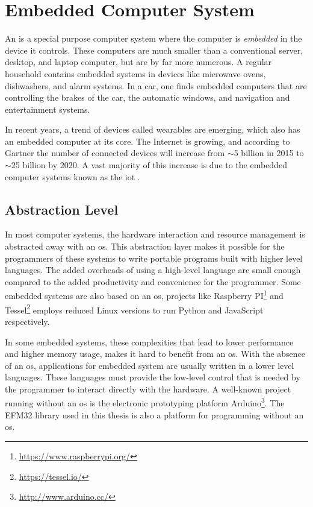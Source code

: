 \section{Embedded Computer System}
An  is a special purpose computer system where the computer is \emph{embedded} in the device it controls.
These computers are much smaller than a conventional server, desktop, and laptop computer, but are by far more numerous.
A regular household contains embedded systems in devices like microwave ovens, dishwashers, and alarm systems.
In a car, one finds embedded computers that are controlling the brakes of the car, the automatic windows, and navigation and entertainment systems.

In recent years, a trend of devices called wearables are emerging, which also has an embedded computer at its core.
The Internet is growing, and according to Gartner \cite{web:gartner} the number of connected devices will increase from $\sim$5 billion in 2015 to $\sim$25 billion by 2020.
A vast majority of this increase is due to the embedded computer systems known as the \gls{iot} \cite{Valhouli2010}.

\subsection{Abstraction Level}
In most computer systems, the hardware interaction and resource management is abstracted away with an \gls{os}.
This abstraction layer makes it possible for the programmers of these systems to write portable programs built with higher level languages.
The added overheads of using a high-level language are small enough compared to the added productivity and convenience for the programmer.
Some embedded systems are also based on an \gls{os}, projects like Raspberry PI\footnote{\url{https://www.raspberrypi.org/}} and Tessel\footnote{\url{https://tessel.io/}} employs reduced Linux versions to run Python and JavaScript respectively.

In some embedded systems, these complexities that lead to lower performance and higher memory usage, makes it hard to benefit from an \gls{os}.
With the absence of an \gls{os}, applications for embedded system are usually written in a lower level languages.
These languages must provide the low-level control that is needed by the programmer to interact directly with the hardware.
A well-known project running without an \gls{os} is the electronic prototyping platform Arduino\footnote{\url{http://www.arduino.cc/}}.
The EFM32 {\emlib} library used in this thesis is also a platform for {\C} programming without an \gls{os}.

